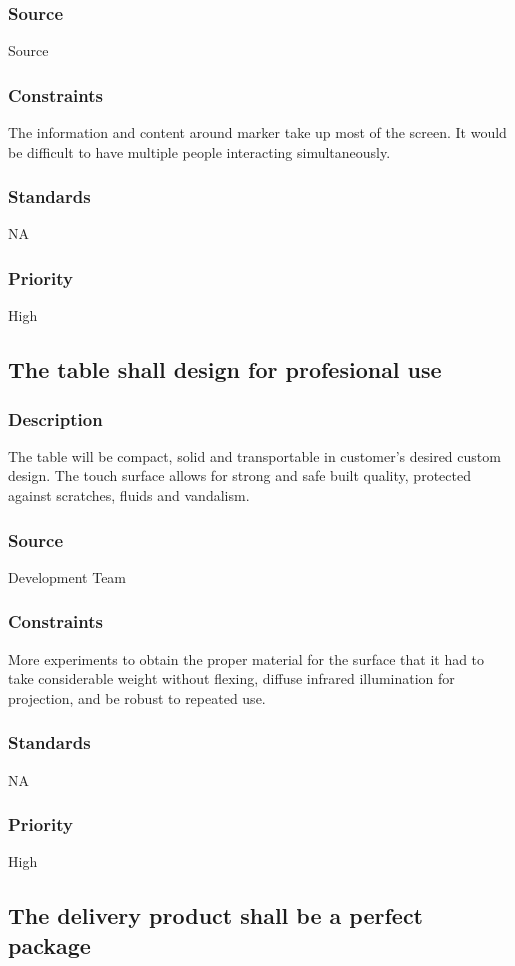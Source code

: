 \subsubsection{Source}
Source
\subsubsection{Constraints}
The information and content around marker take up most of the screen. It would be difficult to have multiple people interacting simultaneously.
\subsubsection{Standards}
NA
\subsubsection{Priority}
High

\subsection{The table shall design for profesional use}
\subsubsection{Description}
The table will be compact, solid and transportable in customer's desired custom design. The touch surface allows for strong and safe built quality, protected against scratches, fluids and vandalism.
\subsubsection{Source}
Development Team
\subsubsection{Constraints}
More experiments to obtain the proper material for the surface that it had to take considerable weight without flexing, diffuse infrared illumination for projection, and be robust to repeated use.
\subsubsection{Standards}
NA
\subsubsection{Priority}
High

\subsection{The delivery product shall be a perfect package}
